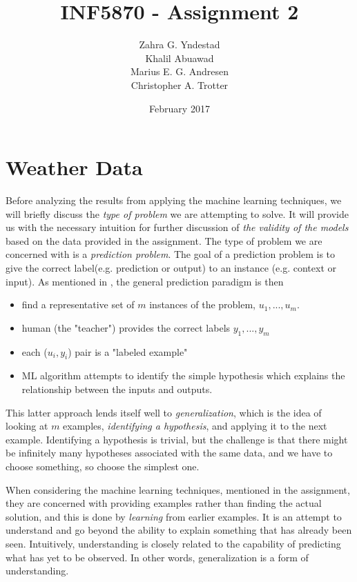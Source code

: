 \documentclass[
11pt, %
english, %
singlespacing, %
parskip, %
headsepline, %
]{report} %
\title{INF5870 - Assignment 2}
\author{Zahra G. Yndestad \\ Khalil Abuawad \\ Marius E. G. Andresen \\ Christopher A. Trotter}
\date{February 2017}
\begin{document}


\frontmatter %

\tableofcontents %

\pagestyle{plain} %

\newpage

\section{Weather Data}
    Before analyzing the results from applying the machine learning techniques, we will briefly discuss the \emph{type of problem} we are attempting to solve. It will provide us with the necessary intuition for further discussion of \emph{the validity of the models} based on the data provided in the assignment. The type of problem we are concerned with is a \emph{prediction problem}. The goal of a prediction problem is to give the correct label(e.g. prediction or output) to an instance (e.g. context or input). As mentioned in \cite{predprob}, the general prediction paradigm is then
    
    \begin{itemize}
        \item find a representative set of $m$ instances of the problem, $u_{1},..., u_{m}$.
        \item human (the "teacher") provides the correct labels $y_{1},...,y_{m}$
        \item each ($u_{i}, y_{i}$) pair is a "labeled example"
        \item ML algorithm attempts to identify the simple hypothesis which explains the relationship between the inputs and outputs.
    \end{itemize}
    
    This latter approach lends itself well to \emph{generalization}, which is the idea of looking at $m$ examples, \emph{identifying a hypothesis}, and applying it to the next example. Identifying a hypothesis is trivial, but the challenge is that there might be infinitely many hypotheses associated with the same data, and we have to choose something, so choose the simplest one.
    
    When considering the machine learning techniques, mentioned in the assignment, they are concerned with providing examples rather than finding the actual solution, and this is done by \emph{learning} from earlier examples. It is an attempt to understand and go beyond the ability to explain something that has already been seen. Intuitively, understanding is closely related to the capability of predicting what has yet to be observed. In other words, generalization is a form of understanding.
    
\end{document}

